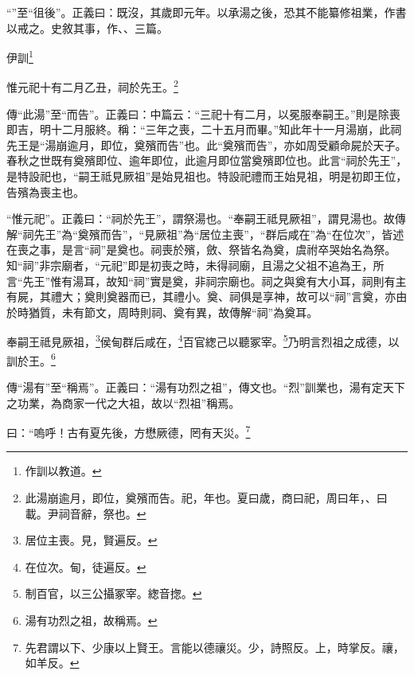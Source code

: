 {\noindent\shu{}\fzkt “”至“徂後”。正義曰：既沒，其歲即元年。以承湯之後，恐其不能纂修祖業，作書以戒之。史敘其事，作、、三篇。 \par}

伊訓\footnote{作訓以教道。}

惟元祀十有二月乙丑，祠於先王。\footnote{此湯崩逾月，即位，奠殯而告。祀，年也。夏曰歲，商曰祀，周曰年，、曰載。尹祠音辭，祭也。}


{\noindent\zhuan{}\fzbyks 傳“此湯”至“而告”。正義曰：中篇云：“三祀十有二月，以冕服奉嗣王。”則是除喪即吉，明十二月服終。稱：“三年之喪，二十五月而畢。”知此年十一月湯崩，此祠先王是“湯崩逾月，即位，奠殯而告”也。此“奠殯而告”，亦如周受顧命屍於天子。春秋之世既有奠殯即位、逾年即位，此逾月即位當奠殯即位也。此言“祠於先王”，是特設祀也，“嗣王祗見厥祖”是始見祖也。特設祀禮而王始見祖，明是初即王位，告殯為喪主也。 \par}

{\noindent\shu{}\fzkt “惟元祀”。正義曰：“祠於先王”，謂祭湯也。“奉嗣王祗見厥祖”，謂見湯也。故傳解“祠先王”為“奠殯而告”，“見厥祖”為“居位主喪”，“群后咸在”為“在位次”，皆述在喪之事，是言“祠”是奠也。祠喪於殯，斂、祭皆名為奠，虞祔卒哭始名為祭。知“祠”非宗廟者，“元祀”即是初喪之時，未得祠廟，且湯之父祖不追為王，所言“先王”惟有湯耳，故知“祠”實是奠，非祠宗廟也。祠之與奠有大小耳，祠則有主有屍，其禮大；奠則奠器而已，其禮小。奠、祠俱是享神，故可以“祠”言奠，亦由於時猶質，未有節文，周時則祠、奠有異，故傳解“祠”為奠耳。 \par}

奉嗣王祗見厥祖，\footnote{居位主喪。見，賢遍反。}侯甸群后咸在，\footnote{在位次。甸，徒遍反。}百官緫己以聽冢宰。\footnote{制百官，以三公攝冢宰。緫音揔。}乃明言烈祖之成德，以訓於王。\footnote{湯有功烈之祖，故稱焉。}

{\noindent\zhuan{}\fzbyks 傳“湯有”至“稱焉”。正義曰：“湯有功烈之祖”，傳文也。“烈”訓業也，湯有定天下之功業，為商家一代之大祖，故以“烈祖”稱焉。 \par}

曰：“嗚呼！古有夏先後，方懋厥德，罔有天災。\footnote{先君謂以下、少康以上賢王。言能以德禳災。少，詩照反。上，時掌反。禳，如羊反。}

